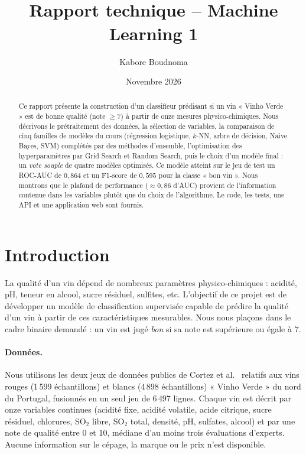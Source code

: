 \documentclass[11pt,a4paper]{article}
\title{\wine{\textbf{Classification de la qualité du vin}}\\[0.4em]\large Rapport technique -- Machine Learning 1}
\author{Kabore Boudnoma}
\date{Novembre 2026}
\begin{document}
\maketitle

\begin{abstract}
\noindent Ce rapport présente la construction d'un classifieur prédisant si un vin « Vinho Verde » est de bonne qualité
(note $\geq 7$) à partir de onze mesures physico-chimiques. Nous décrivons le prétraitement des données, la sélection de variables,
la comparaison de cinq familles de modèles du cours (régression logistique, $k$-NN, arbre de décision, Naive Bayes, SVM) complétés par des méthodes
d'ensemble, l'optimisation des hyperparamètres par Grid Search et Random Search, puis le choix d'un modèle final : un \emph{vote souple} de quatre modèles optimisés.
Ce modèle atteint sur le jeu de test un ROC-AUC de $0{,}864$ et un F1-score de $0{,}595$ pour la classe « bon vin ». Nous montrons que le plafond de
performance ($\approx 0{,}86$ d'AUC) provient de l'information contenue dans les variables plutôt que du choix de l'algorithme. Le code, les tests, une API
et une application web sont fournis.
\end{abstract}

\tableofcontents
\newpage

\section{Introduction}

La qualité d'un vin dépend de nombreux paramètres physico-chimiques : acidité, pH, teneur en alcool, sucre résiduel, sulfites, etc.
L'objectif de ce projet est de développer un modèle de classification supervisée capable de prédire la qualité d'un vin à partir de ces
caractéristiques mesurables. Nous nous plaçons dans le cadre binaire demandé : un vin est jugé \emph{bon} si sa note est supérieure ou égale à 7.

\paragraph{Données.}
Nous utilisons les deux jeux de données publics de Cortez et al.~\cite{cortez2009} relatifs aux vins rouges (1\,599 échantillons) et blancs
(4\,898 échantillons) « Vinho Verde » du nord du Portugal, fusionnés en un seul jeu de $6\,497$ lignes. Chaque vin est décrit par onze variables continues
(acidité fixe, acidité volatile, acide citrique, sucre résiduel, chlorures, SO$_2$ libre, SO$_2$ total, densité, pH, sulfates, alcool) et par une
note de qualité entre 0 et 10, médiane d'au moins trois évaluations d'experts. Aucune information sur le cépage, la marque ou le prix n'est disponible.
\end{document}
